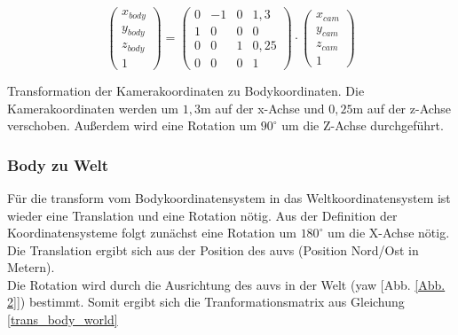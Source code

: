 \begin{ownequation}[H]
\begin{equation}
\begin{pmatrix}
x_{body}\\y_{body}\\z_{body}\\1
\end{pmatrix}
=
\begin{pmatrix}
0 & -1 & 0& 1,3\\
1 & 0 & 0& 0\\
0 & 0 & 1& 0,25\\
0 & 0 & 0 & 1
\end{pmatrix}
\cdot
\begin{pmatrix}
x_{cam}\\y_{cam}\\z_{cam}\\1
\end{pmatrix}
\end{equation}
\caption[\gls{transform} der Kamerakoordinaten zu Bodykoordinaten]{Transformation der Kamerakoordinaten zu Bodykoordinaten. Die Kamerakoordinaten werden um $1,3$m auf der x-Achse und $0,25$m auf der z-Achse verschoben. Außerdem wird eine Rotation um $90^\circ$ um die Z-Achse durchgeführt.}
\label{trans_cam_body}
\end{ownequation}

\subsubsection{Body zu Welt}
Für die \gls{transform} vom Bodykoordinatensystem in das Weltkoordinatensystem ist wieder eine Translation und eine Rotation nötig.
Aus der Definition der Koordinatensysteme folgt zunächst eine Rotation um $180^\circ$ um die X-Achse nötig.
Die Translation ergibt sich aus der Position des \gls{auv}s (Position Nord/Ost in Metern).\\
Die Rotation wird durch die Ausrichtung des \gls{auv}s in der Welt (\gls{yaw} [Abb. \ref{Abb. 2}]) bestimmt. Somit ergibt sich die Tranformationsmatrix aus Gleichung \ref{trans_body_world}\\

